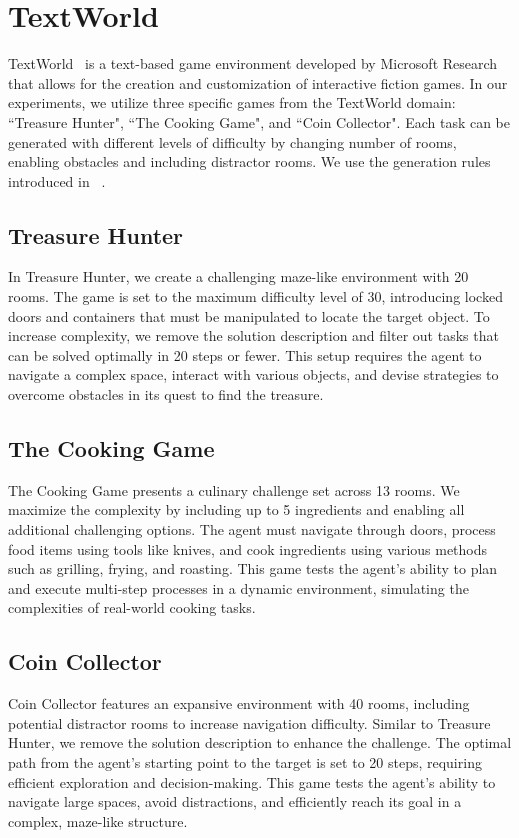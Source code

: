 \section{TextWorld}
\label{textworld}

TextWorld~\citep{cote2019textworld} is a text-based game environment developed by Microsoft Research that allows for the creation and customization of interactive fiction games. In our experiments, we utilize three specific games from the TextWorld domain: ``Treasure Hunter", ``The Cooking Game", and ``Coin Collector". Each task can be generated with different levels of difficulty by changing number of rooms, enabling obstacles and including distractor rooms. We use the generation rules introduced in ~\citet{lu2024intelligent}. 

\subsection{Treasure Hunter}
In Treasure Hunter, we create a challenging maze-like environment with 20 rooms. The game is set to the maximum difficulty level of 30, introducing locked doors and containers that must be manipulated to locate the target object. To increase complexity, we remove the solution description and filter out tasks that can be solved optimally in 20 steps or fewer. This setup requires the agent to navigate a complex space, interact with various objects, and devise strategies to overcome obstacles in its quest to find the treasure.

\subsection{The Cooking Game}
The Cooking Game presents a culinary challenge set across 13 rooms. We maximize the complexity by including up to 5 ingredients and enabling all additional challenging options. The agent must navigate through doors, process food items using tools like knives, and cook ingredients using various methods such as grilling, frying, and roasting. This game tests the agent's ability to plan and execute multi-step processes in a dynamic environment, simulating the complexities of real-world cooking tasks.

\subsection{Coin Collector}
Coin Collector features an expansive environment with 40 rooms, including potential distractor rooms to increase navigation difficulty. Similar to Treasure Hunter, we remove the solution description to enhance the challenge. The optimal path from the agent's starting point to the target is set to 20 steps, requiring efficient exploration and decision-making. This game tests the agent's ability to navigate large spaces, avoid distractions, and efficiently reach its goal in a complex, maze-like structure.

